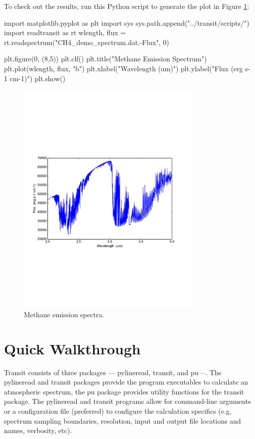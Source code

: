 \documentclass[letterpaper, 12pt]{article}
\begin{document}
\noindent To check out the results, run this Python script to generate
the plot in Figure \ref{fig:demo}: \newline
\begin{python}
import matplotlib.pyplot as plt
import sys
sys.path.append("../transit/scripts/")
import readtransit as rt
wlength, flux = rt.readspectrum("CH4_demo_spectrum.dat.-Flux", 0)

plt.figure(0, (8,5))
plt.clf()
plt.title("Methane Emission Spectrum")
plt.plot(wlength, flux, "b")
plt.xlabel("Wavelength  (um)")
plt.ylabel("Flux  (erg s-1 cm-1)")
plt.show()
\end{python}

\begin{figure}[htb]
\centerline{
\includegraphics[width=0.8\textwidth, clip]{figs/Methane_emission_spectra.pdf}}
\caption{\small Methane emission spectra.}
\label{fig:demo}
\end{figure}

\section{Quick Walkthrough}
\label{sec:walkthrough}

Transit consists of three packages --- pylineread, transit, and pu---.
The pylineread and transit packages provide the program executables to
calculate an atmospheric spectrum, the pu package provides utility
functions for the transit package.  The pylineread and transit
programs allow for command-line arguments or a configuration file
(preferred) to configure the calculation specifics (e.g, spectrum
sampling boundaries, resolution, input and output file locations and
names, verbosity, etc).
\end{document}
